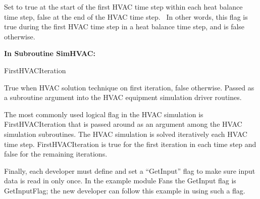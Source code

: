 Set to true at the start of the first HVAC time step within each heat balance time step, false at the end of the HVAC time step.~ In other words, this flag is true during the first HVAC time step in a heat balance time step, and is false otherwise.

\textbf{In Subroutine SimHVAC:}

FirstHVACIteration

True when HVAC solution technique on first iteration, false otherwise. Passed as a subroutine argument into the HVAC equipment simulation driver routines.

The most commonly used logical flag in the HVAC simulation is FirstHVACIteration that is passed around as an argument among the HVAC simulation subroutines. The HVAC simulation is solved iteratively each HVAC time step. FirstHVACIteration is true for the first iteration in each time step and false for the remaining iterations.

Finally, each developer must define and set a ``GetInput'' flag to make sure input data is read in only once. In the example module Fans the GetInput flag is GetInputFlag; the new developer can follow this example in using such a flag.
